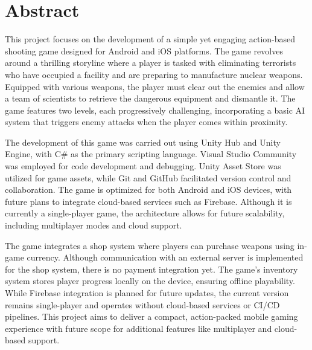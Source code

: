 {\centering\section*{Abstract}}
This project focuses on the development of a simple yet engaging action-based shooting game designed for Android and iOS platforms. The game revolves around a thrilling storyline where a player is tasked with eliminating terrorists who have occupied a facility and are preparing to manufacture nuclear weapons. Equipped with various weapons, the player must clear out the enemies and allow a team of scientists to retrieve the dangerous equipment and dismantle it. The game features two levels, each progressively challenging, incorporating a basic AI system that triggers enemy attacks when the player comes within proximity.

The development of this game was carried out using Unity Hub and Unity Engine, with C\# as the primary scripting language. Visual Studio Community was employed for code development and debugging. Unity Asset Store was utilized for game assets, while Git and GitHub facilitated version control and collaboration. The game is optimized for both Android and iOS devices, with future plans to integrate cloud-based services such as Firebase. Although it is currently a single-player game, the architecture allows for future scalability, including multiplayer modes and cloud support.

The game integrates a shop system where players can purchase weapons using in-game currency. Although communication with an external server is implemented for the shop system, there is no payment integration yet. The game’s inventory system stores player progress locally on the device, ensuring offline playability. While Firebase integration is planned for future updates, the current version remains single-player and operates without cloud-based services or CI/CD pipelines. This project aims to deliver a compact, action-packed mobile gaming experience with future scope for additional features like multiplayer and cloud-based support.
